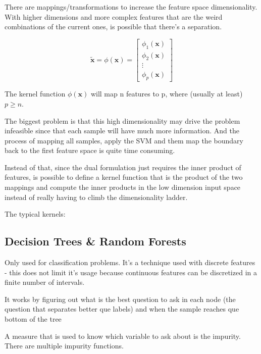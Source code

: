 There are mappings/transformations to increase the feature space dimensionality. With higher dimensions and more complex features that are the weird combinations of the current ones, is possible that there's a separation.

\begin{equation}
    \tilde{\mathbf{x}} = \phi(\mathbf{x}) = 
    \begin{bmatrix}
    \phi_1(\mathbf{x})\\
    \phi_2(\mathbf{x})\\
    \vdots\\
    \phi_p(\mathbf{x})
    \end{bmatrix}
\end{equation}

The kernel function $\phi(\mathbf{x})$ will map n features to p, where (usually at least) $p \geq n$.

The biggest problem is that this high dimensionality may drive the problem infeasible since that each sample will have much more information. And the process of mapping all samples, apply the SVM and them map the boundary back to the first feature space is quite time consuming.

Instead of that, since the dual formulation just requires the inner product of features, is possible to define a kernel function that is the product of the two mappings and compute the inner products in the low dimension input space instead of really having to climb the dimensionality ladder.



The typical kernels:


\subsection{Decision Trees \& Random Forests}

Only used for classification problems.
It's a technique used with discrete features - this does not limit it's usage because continuous features can be discretized in a finite number of intervals.

It works by figuring out what is the best question to ask in each node (the question that separates better que labels) and when the sample reaches que bottom of the tree

A measure that is used to know which variable to ask about is the impurity. There are multiple impurity functions.


